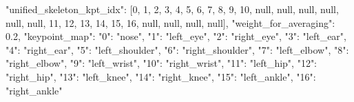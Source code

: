 \startJSON
{
    "unified_skeleton_kpt_idx": [0, 1, 2, 3, 4, 5, 6, 7, 8, 9, 10, null, null,
    null, null, null, null, 11, 12, 13, 14, 15, 16, null, null, null, null],
    "weight_for_averaging": 0.2,
    "keypoint_map": {
        "0": "nose",
        "1": "left_eye",
        "2": "right_eye",
        "3": "left_ear",
        "4": "right_ear",
        "5": "left_shoulder",
        "6": "right_shoulder",
        "7": "left_elbow",
        "8": "right_elbow",
        "9": "left_wrist",
        "10": "right_wrist",
        "11": "left_hip",
        "12": "right_hip",
        "13": "left_knee",
        "14": "right_knee",
        "15": "left_ankle",
        "16": "right_ankle"
    }
}
\stopJSON
\stopbuffer